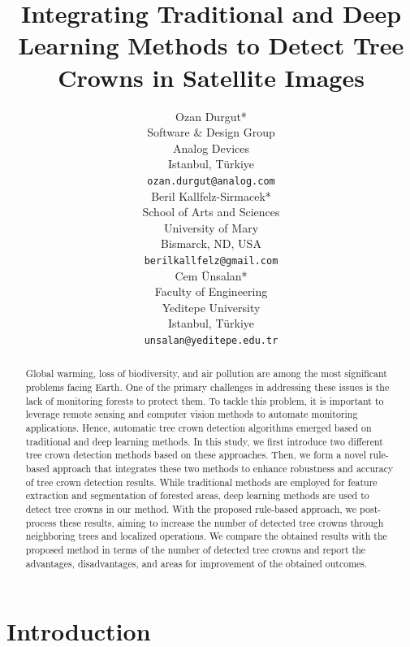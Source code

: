 \documentclass{article}
\title{Integrating Traditional and Deep Learning Methods to Detect Tree Crowns in Satellite Images}
\author{
  Ozan Durgut* \\
  Software \& Design Group \\
  Analog Devices \\
  Istanbul, Türkiye\\
  \texttt{ozan.durgut@analog.com} \\
   \And
  Beril Kallfelz-Sirmacek* \\
  School of Arts and Sciences \\
  University of Mary \\
  Bismarck, ND, USA\\
  \texttt{berilkallfelz@gmail.com} \\
  \And
  Cem Ünsalan*\\
  Faculty of Engineering \\
  Yeditepe University \\
  Istanbul, Türkiye\\
  \texttt{unsalan@yeditepe.edu.tr} \\
}
\begin{document}
\maketitle


\begin{abstract}
Global warming, loss of biodiversity, and air pollution are among the most significant problems facing Earth. One of the primary challenges in addressing these issues is the lack of monitoring forests to protect them. To tackle this problem, it is important to leverage remote sensing and computer vision methods to automate monitoring applications. Hence, automatic tree crown detection algorithms emerged based on traditional and deep learning methods. In this study, we first introduce two different tree crown detection methods based on these approaches. Then, we form a novel rule-based approach that integrates these two methods to enhance robustness and accuracy of tree crown detection results. While traditional methods are employed for feature extraction and segmentation of forested areas, deep learning methods are used to detect tree crowns in our method. With the proposed rule-based approach, we post-process these results, aiming to increase the number of detected tree crowns through neighboring trees and localized operations. We compare the obtained results with the proposed method in terms of the number of detected tree crowns and report the advantages, disadvantages, and areas for improvement of the obtained outcomes.
\end{abstract}


\let\thefootnote\relax{}



\section{Introduction}\label{sect:intro}
\end{document}
